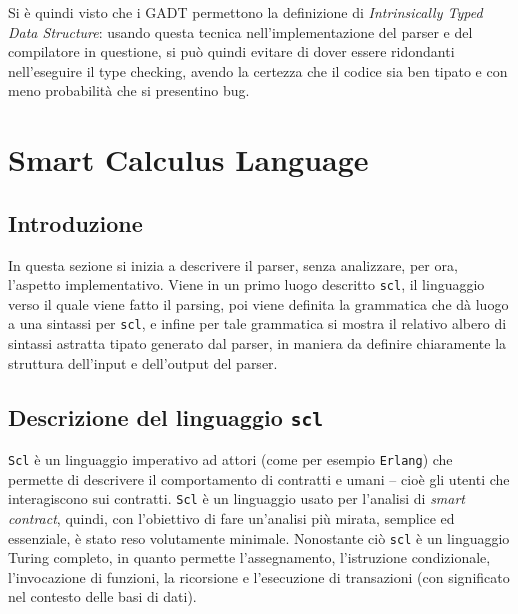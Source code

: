 \documentclass[12pt,a4paper]{report}
\begin{document}
Si è quindi visto che i GADT permettono la definizione di
\emph{Intrinsically Typed Data Structure}: usando questa tecnica
nell'implementazione del parser e del compilatore in questione, si può
quindi evitare di dover essere ridondanti nell'eseguire il type
checking, avendo la certezza che il codice sia ben tipato e con meno
probabilità che si presentino bug.

\newpage

\hypertarget{smart-calculus-language}{%
\chapter{Smart Calculus Language}\label{smart-calculus-language}}

\hypertarget{introduzione-2}{%
\section{Introduzione}\label{introduzione-2}}

In questa sezione si inizia a descrivere il parser, senza analizzare,
per ora, l'aspetto implementativo. Viene in un primo luogo descritto
\texttt{scl}, il linguaggio verso il quale viene fatto il parsing, poi
viene definita la grammatica che dà luogo a una sintassi per
\texttt{scl}, e infine per tale grammatica si mostra il relativo albero
di sintassi astratta tipato generato dal parser, in maniera da definire
chiaramente la struttura dell'input e dell'output del parser.

\hypertarget{descrizione-del-linguaggio-scl}{%
\section{\texorpdfstring{Descrizione del linguaggio
\texttt{scl}}{Descrizione del linguaggio scl}}\label{descrizione-del-linguaggio-scl}}

\texttt{Scl} è un linguaggio imperativo ad attori (come per esempio
\texttt{Erlang}) che permette di descrivere il comportamento di
contratti e umani -- cioè gli utenti che interagiscono sui contratti.
\texttt{Scl} è un linguaggio usato per l'analisi di \emph{smart
contract}, quindi, con l'obiettivo di fare un'analisi più mirata,
semplice ed essenziale, è stato reso volutamente minimale. Nonostante
ciò \texttt{scl} è un linguaggio Turing completo, in quanto permette
l'assegnamento, l'istruzione condizionale, l'invocazione di funzioni, la
ricorsione e l'esecuzione di transazioni (con significato nel contesto
delle basi di dati).
\end{document}
